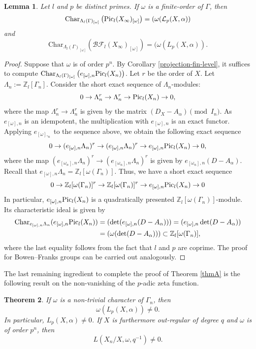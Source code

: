 \documentclass[11pt]{amsart}
\newtheorem{theorem}{Theorem}[section]
\newtheorem{lemma}[theorem]{Lemma}
\numberwithin{equation}{section}
\theoremstyle{remark}
\newcommand{\?}{\stackrel{?}{=}}
\newcommand{\cL}{\mathcal{L}}
\newcommand{\Z}{\mathbb{Z}}
\newcommand{\Char}{\mathrm{Char}}
\newcommand{\BF}{\mathcal{BF}}
\newcommand{\pic}{\textup{Pic}}
\begin{document}
\begin{lemma}\label{lem:finite-char-ideal-non-equal-char}
Let $l$ and $p$ be distinct primes. If $\omega$ is a finite-order of $\Gamma$, then
    \[\Char_{\Lambda_l(\Gamma)_{[\omega]}}\left(\pic_l(X_\infty)_{[\omega]}\right)=(\omega(\cL_p(X,\alpha))\]
    and
     \[\Char_{\Lambda_l(\Gamma)_{[\omega]}}\left(\BF_l(X_\infty)_{[\omega]}\right)=(\omega(L_p(X,\alpha)).\]
\end{lemma}
\begin{proof}
Suppose that $\omega$ is of order $p^n$.    By Corollary \ref{projection-fin-level}, it suffices to compute $\Char_{\Lambda_l(\Gamma)_{[\omega]}}\left(e_{[\omega],n}\pic_l(X_n)\right)$. Let $r$ be the order of $X$. Let $\Lambda_n:=\Z_l[\Gamma_n]$. Consider the short exact sequence of $\Lambda_n$-modules:
    \[0\to \Lambda_n^r\to \Lambda_n^r\to \pic_l(X_n)\to 0,\]
    where the map $\Lambda_n^r\to \Lambda_n^r$ is given by the matrix $(D_X-A_\alpha)\pmod {I_n}$. As $e_{[\omega],n}$ is an idempotent, the multiplication with $e_{[\omega],n}$ is an exact functor.  Applying $e_{[\omega],_n}$ to the sequence above, we obtain the following exact sequence 
    \[0\to (e_{[\omega],n}\Lambda_n)^r\to (e_{[\omega],n}\Lambda_n)^r\to e_{[\omega],n}\pic_l(X_n)\to 0,\]
    where the map $(e_{[\omega_n],n}\Lambda_n)^r\to (e_{[\omega_n],n}\Lambda_n)^r$ is given by $e_{[\omega_n],n}(D-A_\alpha)$. Recall that $e_{[\omega],n}\Lambda_n=\Z_l[\omega(\Gamma_n)]$. Thus, we have a short exact sequence
    \[0\to\Z_l[\omega(\Gamma_n)]^r\to \Z_l[\omega(\Gamma_n)]^r\to e_{[\omega],n}\pic_l(X_n)\to 0\]
    In particular, $e_{[\omega],n}\pic_l(X_n)$ is a quadratically presented $\Z_l[\omega(\Gamma_n)]$-module. Its characteristic ideal is given by
    \begin{align*}\Char_{e_{[\omega],n}\Lambda_n}(e_{[\omega],n}\pic_l(X_n))&=(\det(e_{[\omega],n}(D-A_\alpha)))=(e_{[\omega],n}\det(D-A_\alpha))\\&=(\omega(\det(D-A_\alpha)))\subset \Z_l[\omega(\Gamma_n)],\end{align*}
    where the last equality follows from the fact that $l$ and $p$ are coprime. The proof for Bowen--Franks groups can be carried out analogously.
\end{proof}
The last remaining ingredient to complete the proof of Theorem \ref{thmA} is the following result on the non-vanishing of the $p$-adic zeta function. 
\begin{theorem}\label{thm:non-vanishing}
   If $\omega$ is a non-trivial character of $\Gamma_n$, then $$\omega(L_p(X,\alpha))\ne0.$$ In particular, $L_p(X,\alpha)\ne0$. If $X$ is furthermore out-regular of degree $q$ and $\omega$ is of order $p^n$, then $$L(X_n/X,\omega,q^{-1})\neq 0.$$
\end{theorem}
\end{document}
